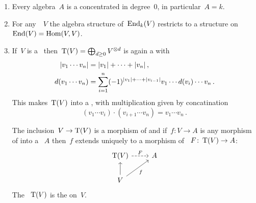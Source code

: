 \documentclass[a4paper,10pt,headings=standardclasses]{scrartcl}
\begin{document}
\begin{examples}
  \label{examples for dgas}
  \leavevmode
  \begin{enumerate}
    \item
      Every algebra~$A$ is a {\dga} concentrated in degree~$0$, in particular~$A = k$.
    \item
      For any~{\dgv}~$V$ the algebra structure of~$\operatorname{End}_k(V)$ restricts to a {\dga} structure on~$\operatorname{End}(V) = \operatorname{Hom}(V,V)$.
    \item
      If~$V$ is a~{\dgv} then~$\operatorname{T}(V) = \bigoplus_{d \geq 0} V^{\otimes d}$ is again a {\dgv} with
      \begin{align*}
        \lvert v_1 \dotsm v_n\rvert
        &=
        \lvert v_1\rvert + \dotsb + \lvert v_n\rvert \,,
      \\
        d(v_1 \dotsm v_n)
        &=
        \sum_{i=1}^n
        (-1)^{\lvert v_1\rvert + \dotsb + \lvert v_{i-1}\rvert}
        v_1 \dotsm d(v_i) \dotsm v_n \,.
      \end{align*}
      This makes~$\operatorname{T}(V)$ into a {\dga}, with multiplication given by concatination
      \[
        (v_1 \dotsm v_i) \cdot (v_{i+1} \dotsm v_n)
        =
        v_1 \dotsm v_n \,.
      \]

      The inclusion~$V \to \operatorname{T}(V)$ is a morphism of {\dgvs} and if~$f \colon V \to A$ is any morphism of {\dgvs} into a {\dga}~$A$ then~$f$ extends uniquely to a morphism of {\dgas}~$F \colon \operatorname{T}(V) \to A$:
      \[
        \begin{tikzcd}
          \dgTensor(V)
          \arrow[dashed]{r}[above]{F}
          &
          A
          \\
          V
          \arrow{u}
          \arrow{ur}[below right]{f}
          &
          {}
        \end{tikzcd}
      \]
      The {\dga}~$\operatorname{T}(V)$ is the  on~$V$.
  \end{enumerate}
\end{examples}
\end{document}
